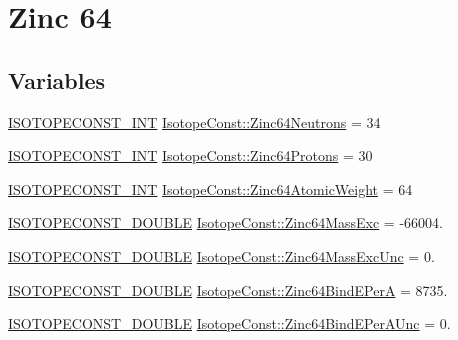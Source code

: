 \hypertarget{group___isotope_const-_zinc-_zn64}{}\section{Zinc 64}
\label{group___isotope_const-_zinc-_zn64}
\subsection*{Variables}
\begin{DoxyCompactItemize}
\item 
\mbox{\hyperlink{group___isotope_const-_macros_ga5f18360b3e99483a35c32d789e62621c}{I\+S\+O\+T\+O\+P\+E\+C\+O\+N\+S\+T\+\_\+\+I\+NT}} \mbox{\hyperlink{group___isotope_const-_zinc-_zn64_ga15c90230c6179d136aa562e7ba0c5eff}{Isotope\+Const\+::\+Zinc64\+Neutrons}} = 34
\item 
\mbox{\hyperlink{group___isotope_const-_macros_ga5f18360b3e99483a35c32d789e62621c}{I\+S\+O\+T\+O\+P\+E\+C\+O\+N\+S\+T\+\_\+\+I\+NT}} \mbox{\hyperlink{group___isotope_const-_zinc-_zn64_gaccc8c802f937d0b74a2f300c9fda92dd}{Isotope\+Const\+::\+Zinc64\+Protons}} = 30
\item 
\mbox{\hyperlink{group___isotope_const-_macros_ga5f18360b3e99483a35c32d789e62621c}{I\+S\+O\+T\+O\+P\+E\+C\+O\+N\+S\+T\+\_\+\+I\+NT}} \mbox{\hyperlink{group___isotope_const-_zinc-_zn64_gaa7403e628d471c1958edb68ec98e66cc}{Isotope\+Const\+::\+Zinc64\+Atomic\+Weight}} = 64
\item 
\mbox{\hyperlink{group___isotope_const-_macros_ga8f45a7272ce02c0b4c65c44636ed719a}{I\+S\+O\+T\+O\+P\+E\+C\+O\+N\+S\+T\+\_\+\+D\+O\+U\+B\+LE}} \mbox{\hyperlink{group___isotope_const-_zinc-_zn64_gafdea61f53e622f90505d455afec642b3}{Isotope\+Const\+::\+Zinc64\+Mass\+Exc}} = -\/66004.
\item 
\mbox{\hyperlink{group___isotope_const-_macros_ga8f45a7272ce02c0b4c65c44636ed719a}{I\+S\+O\+T\+O\+P\+E\+C\+O\+N\+S\+T\+\_\+\+D\+O\+U\+B\+LE}} \mbox{\hyperlink{group___isotope_const-_zinc-_zn64_gafa33b07dff4058980ea2e0817e00f0b4}{Isotope\+Const\+::\+Zinc64\+Mass\+Exc\+Unc}} = 0.
\item 
\mbox{\hyperlink{group___isotope_const-_macros_ga8f45a7272ce02c0b4c65c44636ed719a}{I\+S\+O\+T\+O\+P\+E\+C\+O\+N\+S\+T\+\_\+\+D\+O\+U\+B\+LE}} \mbox{\hyperlink{group___isotope_const-_zinc-_zn64_ga2bede45dcc03d5bcad0a09b8699dd285}{Isotope\+Const\+::\+Zinc64\+Bind\+E\+PerA}} = 8735.
\item 
\mbox{\hyperlink{group___isotope_const-_macros_ga8f45a7272ce02c0b4c65c44636ed719a}{I\+S\+O\+T\+O\+P\+E\+C\+O\+N\+S\+T\+\_\+\+D\+O\+U\+B\+LE}} \mbox{\hyperlink{group___isotope_const-_zinc-_zn64_ga6f4b67565c7492e55c063000ead7bc0f}{Isotope\+Const\+::\+Zinc64\+Bind\+E\+Per\+A\+Unc}} = 0.

\end{DoxyCompactItemize}
